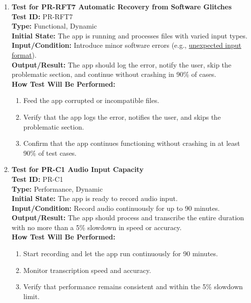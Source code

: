 \documentclass[12pt, titlepage]{article}
\begin{document}
\begin{enumerate}
    \item \textbf{Test for PR-RFT7 Automatic Recovery from Software Glitches} \\
      \newline
      \textbf{Test ID:} PR-RFT7 \\
      \textbf{Type:} Functional, Dynamic \\
      \textbf{Initial State:} The app is running and processes files with varied input types. \\
      \textbf{Input/Condition:} Introduce minor software errors (e.g., \href{https://github.com/JaakLipp/ScoreGen/tree/main/test/TestingDatasets/sample-formats}{unexpected input format}). \\
      \textbf{Output/Result:} The app should log the error, notify the user, skip the problematic section, and continue without crashing in 90\% of cases. \\
      \textbf{How Test Will Be Performed:}
      \begin{enumerate}
          \item Feed the app corrupted or incompatible files.
          \item Verify that the app logs the error, notifies the user, and skips the problematic section.
          \item Confirm that the app continues functioning without crashing in at least 90\% of test cases.
      \end{enumerate}

    \item \textbf{Test for PR-C1 Audio Input Capacity} \\
      \newline
      \textbf{Test ID:} PR-C1 \\
      \textbf{Type:} Performance, Dynamic \\
      \textbf{Initial State:} The app is ready to record audio input. \\
      \textbf{Input/Condition:} Record audio continuously for up to 90 minutes. \\
      \textbf{Output/Result:} The app should process and transcribe the entire duration with no more than a 5\% slowdown in speed or accuracy. \\
      \textbf{How Test Will Be Performed:}
      \begin{enumerate}
          \item Start recording and let the app run continuously for 90 minutes.
          \item Monitor transcription speed and accuracy.
          \item Verify that performance remains consistent and within the 5\% slowdown limit.
      \end{enumerate}


\end{enumerate}
\end{document}
